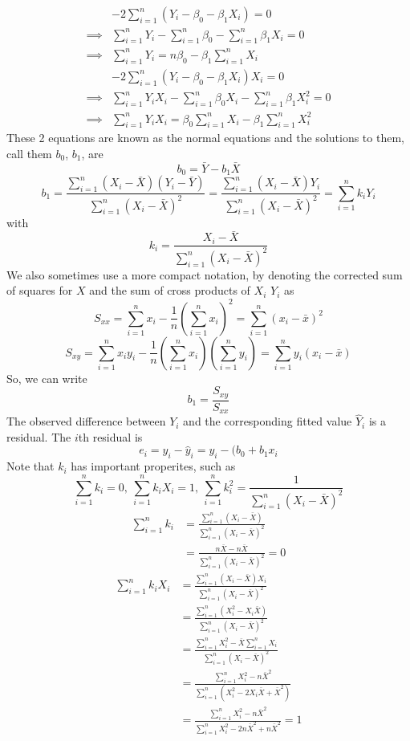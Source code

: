 \begin{align*}
    &-2\sum_{i=1}^n (Y_i - \beta_0 - \beta_1X_i) = 0\\
    \implies& \sum_{i=1}^n Y_i - \sum_{i=1}^n\beta_0 - \sum_{i=1}^n\beta_1X_i = 0 \\
    \implies&  \sum_{i=1}^n Y_i = n\beta_0 - \beta_1\sum_{i=1}^nX_i \\
    &-2\sum_{i=1}^n (Y_i - \beta_0 - \beta_1X_i)X_i = 0\\
    \implies& \sum_{i=1}^n Y_iX_i - \sum_{i=1}^n\beta_0 X_i -  \sum_{i=1}^n\beta_1X_i^2 = 0\\
    \implies& \sum_{i=1}^n Y_iX_i = \beta_0\sum_{i=1}^nX_i - \beta_1 \sum_{i=1}^nX_i^2
\end{align*}
These 2 equations are known as the normal equations and the solutions to them, call them $b_0$, $b_1$, are
\[b_0 = \bar{Y} - b_1\bar{X}\]
\[b_1 = \frac{\sum_{i=1}^n (X_i - \bar{X})(Y_i - \bar{Y})}{\sum_{i=1}^n (X_i - \bar{X})^2 } = \frac{\sum_{i=1}^n(X_i -\bar{X})Y_i}{\sum_{i=1}^n(X_i-\bar{X})^2} = \sum_{i=1}^n k_iY_i\]
with 
\[k_i = \frac{X_i - \bar{X}}{\sum_{i=1}^n (X_i - \bar{X})^2}\]
We also sometimes use a more compact notation, by denoting the corrected sum of squares for $X$ and the sum of cross products of $X_i$ $Y_i$ as 
\[S_{xx} = \sum_{i=1}^n x_i - \frac{1}{n} \left(\sum_{i=1}^n x_i\right)^2 = \sum_{i=1}^n (x_i - \bar{x})^2 \]
\[S_{xy} = \sum_{i=1}^n x_iy_i - \frac{1}{n}\left(\sum_{i=1}^n x_i\right)\left(\sum_{i=1}^n y_i\right) = \sum_{i=1}^n y_i(x_i - \bar{x})\]
So, we can write 
\[b_1 = \frac{S_{xy}}{S_{xx}}\]
The observed difference between $Y_i$ and the corresponding fitted value $\hat{Y}_i$ is a residual. The $i$th residual is 
\[e_i = y_i - \hat{y}_i = y_i - (b_0 + b_1x_i\]
Note that $k_i$ has important properites, such as 
\[\sum_{i=1}^n k_i = 0, \ \sum_{i=1}^n k_iX_i = 1,\ \sum_{i=1}^n k_i^2 = \frac{1}{\sum_{i=1}^n (X_i - \bar{X})^2}\]
\begin{align*}
    \sum_{i=1}^n k_i &= \frac{\sum_{i=1}^n (X_i - \bar{X})}{\sum_{i=1}^n (X_i - \bar{X})^2}\\
    &= \frac{n\bar{X} - n\bar{X}}{\sum_{i=1}^n (X_i-\bar{X})^2 } = 0
\end{align*}
\begin{align*}
    \sum_{i=1}^n k_iX_i &= \frac{\sum_{i=1}^n (X_i - \bar{X})X_i}{\sum_{i=1}^n (X_i - \bar{X})^2}\\
    &= \frac{\sum_{i=1}^n (X_i^2 - X_i\bar{X})}{\sum_{i=1}^n  (X_i - \bar{X})^2}\\
    &= \frac{\sum_{i=1}^n X_i^2 - \bar{X}\sum_{i=1}^n X_i}{\sum_{i=1}^n (X_i - \bar{X})^2}\\
    &= \frac{\sum_{i=1}^n X_i^2 - n\bar{X}^2}{\sum_{i=1}^n (X_i^2 - 2X_i\bar{X} + \bar{X}^2)}\\
    &= \frac{\sum_{i=1}^n X_i^2 - n\bar{X}^2}{\sum_{i=1}^n X_i^2 - 2n\bar{X}^2 + n\bar{X}^2} = 1
\end{align*}
